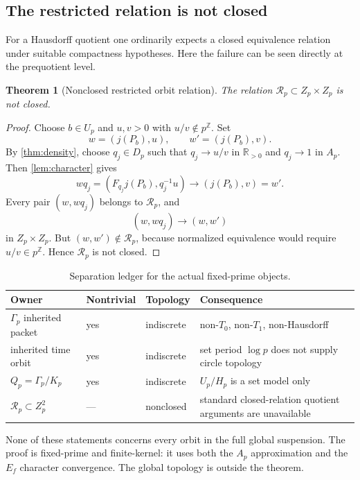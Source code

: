 \documentclass[11pt]{article}
\newtheorem{theorem}{Theorem}[section]
\theoremstyle{definition}
\newcommand{\R}{\mathbb{R}}
\newcommand{\Z}{\mathbb{Z}}
\newcommand{\Rp}{\mathcal R_p}
\begin{document}
\subsection{The restricted relation is not closed}

For a Hausdorff quotient one ordinarily expects a closed equivalence relation under suitable compactness hypotheses.  Here the failure can be seen directly at the prequotient level.

\begin{theorem}[Nonclosed restricted orbit relation]\label{thm:nonclosed}
The relation \(\Rp\subset Z_p\times Z_p\) is not closed.
\end{theorem}

\begin{proof}
Choose \(b\in U_p\) and \(u,v>0\) with \(u/v\notin p^{\Z}\).  Set
\[
 w=(j(P_b),u),\qquad w'=(j(P_b),v).
\]
By \cref{thm:density}, choose \(q_j\in D_p\) such that \(q_j\to u/v\) in \(\R_{>0}\) and \(q_j\to1\) in \(A_p\).  Then \cref{lem:character} gives
\[
 wq_j=(F_{q_j}j(P_b),q_j^{-1}u)\longrightarrow(j(P_b),v)=w'.
\]
Every pair \((w,wq_j)\) belongs to \(\Rp\), and
\[
 (w,wq_j)\longrightarrow(w,w')
\]
in \(Z_p\times Z_p\).  But \((w,w')\notin\Rp\), because normalized equivalence would require \(u/v\in p^{\Z}\).  Hence \(\Rp\) is not closed.
\end{proof}

\begin{table}[htbp]
\centering\small
\caption{Separation ledger for the actual fixed-prime objects.}\label{tab:separation}
\begin{tabularx}{\textwidth}{P{0.27\textwidth}P{0.18\textwidth}P{0.18\textwidth}Y}
\toprule
Owner & Nontrivial & Topology & Consequence \\
\midrule
\(\Gamma_p\) inherited packet & yes & indiscrete & non-\(T_0\), non-\(T_1\), non-Hausdorff\\
inherited time orbit & yes & indiscrete & set period \(\log p\) does not supply circle topology\\
\(Q_p=\Gamma_p/K_p\) & yes & indiscrete & \(U_p/H_p\) is a set model only\\
\(\Rp\subset Z_p^2\) & --- & nonclosed & standard closed-relation quotient arguments are unavailable\\
\bottomrule
\end{tabularx}
\end{table}

None of these statements concerns every orbit in the full global suspension.  The proof is fixed-prime and finite-kernel: it uses both the \(A_p\) approximation and the \(E_f\) character convergence.  The global topology is outside the theorem.
\end{document}
